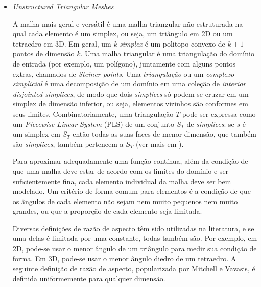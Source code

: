 \documentclass[a4paper, 12 pt]{article} %
\begin{document}
\begin{itemize}
	\item \textit{Unstructured Triangular Meshes}
	
	\hspace{0.5cm} A malha mais geral e versátil é uma malha triangular não estruturada na qual cada elemento é um simplex, ou seja, um triângulo em 2D ou um tetraedro em 3D. Em geral, um \textit{k-simplex} é um politopo convexo de $k + 1$ pontos de dimensão $k$. Uma malha triangular é uma triangulação do domínio de entrada (por exemplo, um polígono), juntamente com alguns pontos extras, chamados de \textit{Steiner points}. Uma \textit{triangulação} ou um \textit{complexo simplicial} é uma decomposição de um domínio em uma coleção de \textit{interior disjointed simplices}, de modo que dois \textit{simplices} só podem se cruzar em um simplex de dimensão inferior, ou seja, elementos vizinhos são conformes em seus limites.
	Combinatoriamente, uma triangulação $T$ pode ser expressa como um \textit{Piecewise Linear System} (PLS) de um conjunto $S_{T}$ de \textit{simplices}: se $s$ é um simplex em $S_{T}$ então todas as suas faces de menor dimensão, que também são \textit{simplices}, também pertencem a $S_{T}$ (ver mais em \citealp{teng2000unstructured}).
	
	\hspace{0.5cm} Para aproximar adequadamente uma função contínua, além da condição de que uma malha deve estar de acordo com os limites do domínio e ser suficientemente fina, cada elemento individual da malha deve ser bem modelado. Um critério de forma comum para elementos é a condição de que os ângulos de cada elemento não sejam nem muito pequenos nem muito grandes, ou que a proporção de cada elemento seja limitada.
	
	\hspace{0.5cm} Diversas definições de razão de aspecto têm sido utilizadas na literatura, e se uma delas é limitada por uma constante, todas também são. Por exemplo, em 2D, pode-se usar o menor ângulo de um triângulo para medir sua condição de forma. Em 3D, pode-se usar o menor ângulo diedro de um tetraedro. A seguinte definição de razão de aspecto, popularizada por Mitchell e Vavasis, é definida uniformemente para qualquer dimensão.
\end{itemize}
\end{document}
